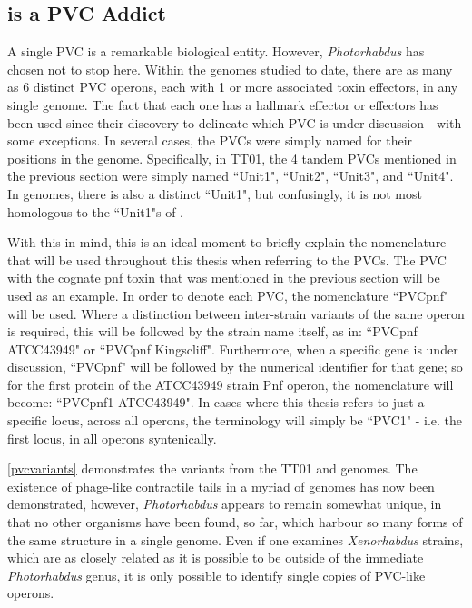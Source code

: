 \subsection{\Pa{} is a PVC Addict}
A single PVC is a remarkable biological entity. However, \emph{Photorhabdus} has chosen not to stop here. Within the genomes studied to date, there are as many as 6 distinct PVC operons, each with 1 or more associated toxin effectors, in any single genome. The fact that each one has a hallmark effector or effectors has been used since their discovery to delineate which PVC is under discussion \citep{Yang2006} - with some exceptions. In several cases, the PVCs were simply named for their positions in the genome. Specifically, in \Plum{} TT01, the 4 tandem PVCs mentioned in the previous section were simply named ``Unit1", ``Unit2", ``Unit3", and ``Unit4". In \Pasy {} genomes, there is also a distinct ``Unit1", but confusingly, it is not most homologous to the ``Unit1"s of \Plum.

With this in mind, this is an ideal moment to briefly explain the nomenclature that will be used throughout this thesis when referring to the PVCs. The PVC with the cognate pnf toxin that was mentioned in the previous section will be used as an example. In order to denote each PVC, the nomenclature ``PVCpnf" will be used. Where a distinction between inter-strain variants of the same operon is required, this will be followed by the strain name itself, as in: ``PVCpnf ATCC43949" or ``PVCpnf Kingscliff". Furthermore, when a specific gene is under discussion, ``PVCpnf" will be followed by the numerical identifier for that gene; so for the first protein of the \Pasy{} ATCC43949 strain Pnf operon, the nomenclature will become: ``PVCpnf1 ATCC43949". In cases where this thesis refers to just a specific locus, across all operons, the terminology will simply be ``PVC1" - i.e. the first locus, in all operons syntenically.

\vref{pvcvariants} demonstrates the variants from the \Plum{} TT01 and \Pasy{} genomes. The existence of phage-like contractile tails in a myriad of genomes has now been demonstrated, however, \emph{Photorhabdus} appears to remain somewhat unique, in that no other organisms have been found, so far, which harbour so many forms of the same structure in a single genome. Even if one examines \emph{Xenorhabdus} strains, which are as closely related as it is possible to be outside of the immediate \emph{Photorhabdus} genus, it is only possible to identify single copies of PVC-like operons.

